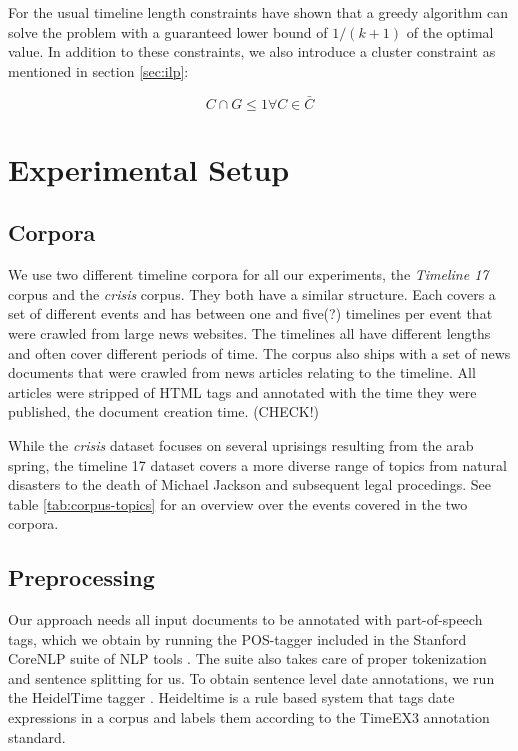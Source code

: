 \documentclass[a4paper,BCOR=10mm]{report}
\begin{document}
 For the usual timeline length constraints \citet{markert} have shown that a greedy algorithm can solve the problem with a guaranteed lower bound of $1 / (k + 1)$ of the optimal value.
 In addition to these constraints, we also introduce a cluster constraint as mentioned in section \ref{sec:ilp}:

\begin{displaymath}
C \cap G \leq 1 \forall C \in \bar{C}
\end{displaymath}

\chapter{Experimental Setup}

\section{Corpora}

We use two different timeline corpora for all our experiments, the \textit{Timeline 17} corpus \citet{tran-tl17} and the \textit{crisis} corpus. They both have a similar structure. Each covers a set of different events and has between one and five(?) timelines per event that were crawled from large news websites. The timelines all have different lengths and often cover different periods of time. The corpus also ships with a set of news documents that were crawled from news articles relating to the timeline. All articles were stripped of HTML tags and annotated with the time they were published, the document creation time. (CHECK!)

While the \textit{crisis} dataset focuses on several uprisings resulting from the arab spring, the timeline 17 dataset covers a more diverse range of topics from natural disasters to the death of Michael Jackson and subsequent legal procedings. See table \ref{tab:corpus-topics} for an overview over the events covered in the two corpora.

\section{Preprocessing}

Our approach needs all input documents to be annotated with part-of-speech tags, which we obtain by running the POS-tagger included in the Stanford CoreNLP suite of NLP tools \citep{stanford-corenlp}. The suite also takes care of proper tokenization and sentence splitting for us.
To obtain sentence level date annotations, we run the HeidelTime tagger \citet{heideltime}. Heideltime is a rule based system that tags date expressions in a corpus and labels them according to the TimeEX3 annotation standard.
\end{document}
